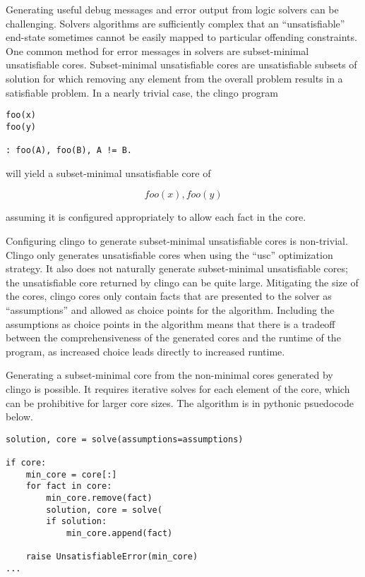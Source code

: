 Generating useful debug messages and error output from logic solvers can be challenging.
Solvers algorithms are sufficiently complex that an ``unsatisfiable'' end-state sometimes cannot be easily mapped to particular offending constraints.
One common method for error messages in solvers are subset-minimal unsatisfiable cores.
Subset-minimal unsatisfiable cores are unsatisfiable subsets of solution for which removing any element from the overall problem results in a satisfiable problem.
In a nearly trivial case, the clingo program

\begin{verbatim}
foo(x)
foo(y)

: foo(A), foo(B), A != B.
\end{verbatim}

will yield a subset-minimal unsatisfiable core of

$$ {foo(x), foo(y)} $$

assuming it is configured appropriately to allow each fact in the core.

Configuring clingo to generate subset-minimal unsatisfiable cores is non-trivial.
Clingo only generates unsatisfiable cores when using the ``usc'' optimization strategy.
It also does not naturally generate subset-minimal unsatisfiable cores; the unsatisfiable core returned by clingo can be quite large.
Mitigating the size of the cores, clingo cores only contain facts that are presented to the solver as ``assumptions'' and allowed as choice points for the algorithm.
Including the assumptions as choice points in the algorithm means that there is a tradeoff between the comprehensiveness of the generated cores and the runtime of the program, as increased choice leads directly to increased runtime.

Generating a subset-minimal core from the non-minimal cores generated by clingo is possible.
It requires iterative solves for each element of the core, which can be prohibitive for larger core sizes.
The algorithm is in pythonic psuedocode below.

\begin{verbatim}
solution, core = solve(assumptions=assumptions)

if core:
    min_core = core[:]
    for fact in core:
        min_core.remove(fact)
        solution, core = solve(
        if solution:
            min_core.append(fact)

    raise UnsatisfiableError(min_core)
...
\end{verbatim}

